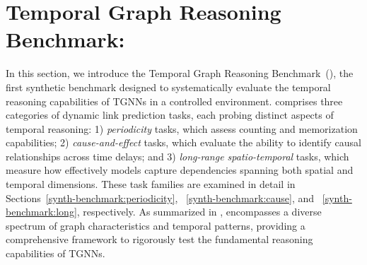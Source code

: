 \section{Temporal Graph Reasoning Benchmark: 
\benchmarkname}\label{sec:tgrab}


 In this section, we introduce the Temporal Graph Reasoning Benchmark~(\benchmarkname), the first synthetic benchmark designed to systematically evaluate the temporal reasoning capabilities of TGNNs in a controlled environment. \benchmarkname comprises three categories of dynamic link prediction tasks, each probing distinct aspects of temporal reasoning: 1) \emph{periodicity} tasks, which assess counting and memorization capabilities; 2) \emph{cause-and-effect} tasks, which evaluate the ability to identify causal relationships across time delays; and 3) \emph{long-range spatio-temporal} tasks, which measure how effectively models capture dependencies spanning both spatial and temporal dimensions. These task families are examined in detail in Sections~\ref{synth-benchmark:periodicity}, ~\ref{synth-benchmark:cause}, and ~\ref{synth-benchmark:long}, respectively. As summarized in , \benchmarkname encompasses a diverse spectrum of graph characteristics and temporal patterns, providing a comprehensive framework to rigorously test the fundamental reasoning capabilities of TGNNs.

\begin{table}[t]
\caption{\benchmarkname dataset statistics and characteristics. } \label{tab:data} 
\end{table}

